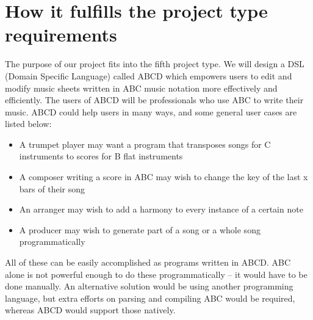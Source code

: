 \section{How it fulfills the project type requirements}

The purpose of our project fits into the fifth project type. We will design a DSL (Domain Specific Language) called ABCD which empowers users to edit and modify music sheets written in ABC music notation more effectively and efficiently. The users of ABCD will be professionals who use ABC to write their music. ABCD could help users in many ways, and some general user cases are listed below:
\begin{itemize}
    \item A trumpet player may want a program that transposes songs for C instruments to scores for B flat 	instruments
	\item A composer writing a score in ABC may wish to change the key of the last x bars of their song
	\item An arranger may wish to add a harmony to every instance of a certain note
	\item A producer may wish to generate part of a song or a whole song programmatically
\end{itemize}

All of these can be easily accomplished as programs written in ABCD. ABC alone is not powerful enough to do these programmatically -- it would have to be done manually. An alternative solution would be using another programming language, but  extra efforts on parsing and compiling ABC would be required, whereas ABCD would support those natively.
